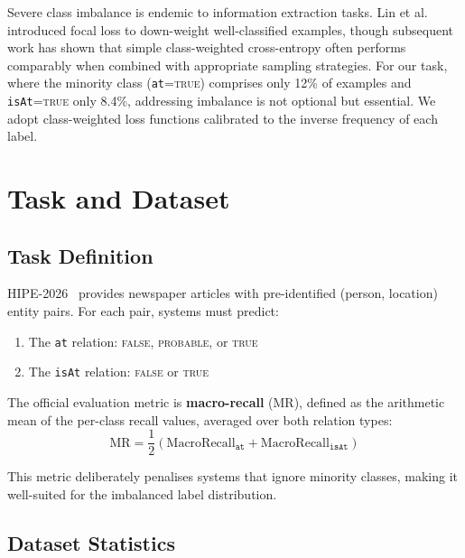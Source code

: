 \documentclass[runningheads]{llncs}
\begin{document}
Severe class imbalance is endemic to information extraction tasks. Lin et al.~\cite{lin2017} introduced focal loss to down-weight well-classified examples, though subsequent work has shown that simple class-weighted cross-entropy often performs comparably when combined with appropriate sampling strategies. For our task, where the minority class (\texttt{at}=\textsc{true}) comprises only 12\% of examples and \texttt{isAt}=\textsc{true} only 8.4\%, addressing imbalance is not optional but essential. We adopt class-weighted loss functions calibrated to the inverse frequency of each label.

\section{Task and Dataset}
\label{sec:dataset}

\subsection{Task Definition}

HIPE-2026~\cite{opitz2026} provides newspaper articles with pre-identified (person, location) entity pairs. For each pair, systems must predict:
\begin{enumerate}
    \item The \texttt{at} relation: \textsc{false}, \textsc{probable}, or \textsc{true}
    \item The \texttt{isAt} relation: \textsc{false} or \textsc{true}
\end{enumerate}

The official evaluation metric is \textbf{macro-recall} (MR), defined as the arithmetic mean of the per-class recall values, averaged over both relation types:
\begin{equation}
    \text{MR} = \frac{1}{2}\left(\text{MacroRecall}_{\texttt{at}} + \text{MacroRecall}_{\texttt{isAt}}\right)
\end{equation}

This metric deliberately penalises systems that ignore minority classes, making it well-suited for the imbalanced label distribution.

\subsection{Dataset Statistics}
\end{document}
